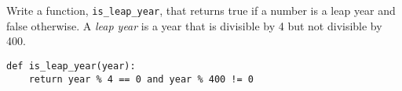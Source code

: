 \begin{blocksection}
\question Write a function, \lstinline$is_leap_year$, that returns true if a number is a leap year and false otherwise.
A \emph{leap year} is a year that is divisible by 4 but not divisible by 400.

\begin{solution}[1.5in]
\begin{lstlisting}
def is_leap_year(year):
    return year % 4 == 0 and year % 400 != 0
\end{lstlisting}
\end{solution}
\end{blocksection}
